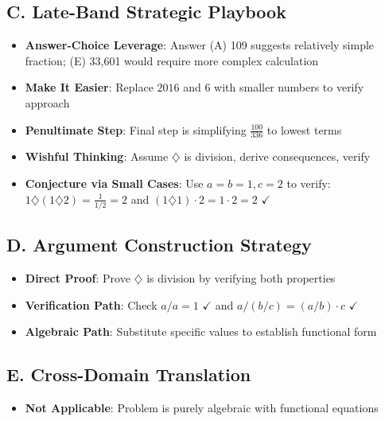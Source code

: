 \documentclass[11pt]{article}
\begin{document}
\begin{strategicbox}
\subsection*{C. Late-Band Strategic Playbook}
\begin{itemize}[leftmargin=*]
    \item \textbf{Answer-Choice Leverage}: Answer (A) 109 suggests relatively simple fraction; (E) 33,601 would require more complex calculation
    \item \textbf{Make It Easier}: Replace $2016$ and $6$ with smaller numbers to verify approach
    \item \textbf{Penultimate Step}: Final step is simplifying $\frac{100}{336}$ to lowest terms
    \item \textbf{Wishful Thinking}: Assume $\diamondsuit$ is division, derive consequences, verify
    \item \textbf{Conjecture via Small Cases}: Use $a=b=1, c=2$ to verify: $1 \diamondsuit (1 \diamondsuit 2) = \frac{1}{1/2} = 2$ and $(1 \diamondsuit 1) \cdot 2 = 1 \cdot 2 = 2$ $\checkmark$
\end{itemize}

\subsection*{D. Argument Construction Strategy}
\begin{itemize}[leftmargin=*]
    \item \textbf{Direct Proof}: Prove $\diamondsuit$ is division by verifying both properties
    \item \textbf{Verification Path}: Check $a/a = 1$ $\checkmark$ and $a/(b/c) = (a/b) \cdot c$ $\checkmark$
    \item \textbf{Algebraic Path}: Substitute specific values to establish functional form
\end{itemize}

\subsection*{E. Cross-Domain Translation}
\begin{itemize}[leftmargin=*]
    \item \textbf{Not Applicable}: Problem is purely algebraic with functional equations
\end{itemize}
\end{strategicbox}
\end{document}
